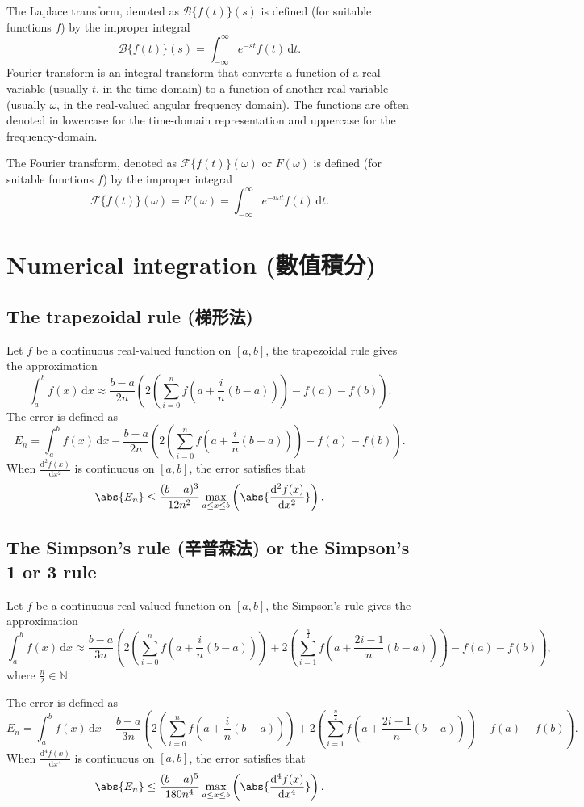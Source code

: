 \documentclass[a4paper,12pt]{report}
\begin{document}
The Laplace transform, denoted as $\mathcal{B}\{f(t)\}(s)$ is defined (for suitable functions $f$) by the improper integral
\[\mathcal{B}\{f(t)\}(s) = \int_{-\infty}^{\infty} e^{-st} f(t)\,\mathrm{d}t.\]
Fourier transform is an integral transform that converts a function of a real variable (usually $t$, in the time domain) to a function of another real variable (usually $\omega$, in the real-valued angular frequency domain). The functions are often denoted in lowercase for the time-domain representation and uppercase for the frequency-domain.

The Fourier transform, denoted as $\mathcal{F}\{f(t)\}(\omega)$ or $F(\omega)$ is defined (for suitable functions $f$) by the improper integral
\[\mathcal{F}\{f(t)\}(\omega) = F(\omega) = \int_{-\infty}^{\infty} e^{-i\omega t} f(t)\,\mathrm{d}t.\]



\section{Numerical integration (數值積分)}
\subsection{The trapezoidal rule (梯形法)}
Let $f$ be a continuous real-valued function on $[a,b]$, the trapezoidal rule gives the approximation
\[\int_a^bf(x)\,\mathrm{d}x\approx\frac{b-a}{2n}\left(2\left(\sum_{i=0}^nf(a+\frac{i}{n}(b-a))\right)-f(a)-f(b)\right).\]
The error is defined as
\[E_n=\int_a^bf(x)\,\mathrm{d}x-\frac{b-a}{2n}\left(2\left(\sum_{i=0}^nf(a+\frac{i}{n}(b-a))\right)-f(a)-f(b)\right).\]
When $\frac{\mathrm{d}^2f(x)}{\mathrm{d}x^2}$ is continuous on $[a,b]$, the error satisfies that
\[\abs{E_n}\leq\frac{(b-a)^3}{12n^2}\max_{a\leq x\leq b}\left(\abs{\frac{\mathrm{d}^2f(x)}{\mathrm{d}x^2}}\right).\]
\subsection{The Simpson's rule (辛普森法) or the Simpson's 1 or 3 rule}
Let $f$ be a continuous real-valued function on $[a,b]$, the Simpson's rule gives the approximation
\[\int_a^bf(x)\,\mathrm{d}x\approx\frac{b-a}{3n}\left(2\left(\sum_{i=0}^nf(a+\frac{i}{n}(b-a))\right)+2\left(\sum_{i=1}^{\frac{n}{2}}f(a+\frac{2i-1}{n}(b-a))\right)-f(a)-f(b)\right),\]
where $\frac{n}{2}\in\mathbb{N}$.

The error is defined as
\[E_n=\int_a^bf(x)\,\mathrm{d}x-\frac{b-a}{3n}\left(2\left(\sum_{i=0}^nf(a+\frac{i}{n}(b-a))\right)+2\left(\sum_{i=1}^{\frac{n}{2}}f(a+\frac{2i-1}{n}(b-a))\right)-f(a)-f(b)\right).\]
When $\frac{\mathrm{d}^4f(x)}{\mathrm{d}x^4}$ is continuous on $[a,b]$, the error satisfies that
\[\abs{E_n}\leq\frac{(b-a)^5}{180n^4}\max_{a\leq x\leq b}\left(\abs{\frac{\mathrm{d}^4f(x)}{\mathrm{d}x^4}}\right).\]
\end{document}
